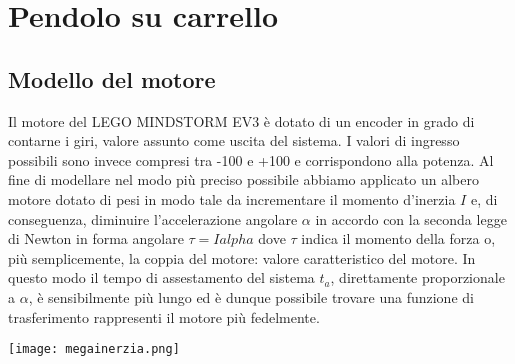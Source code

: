 
\chapter{Pendolo su carrello}
\section{Modello del motore}
Il motore del LEGO MINDSTORM EV3 è dotato di un encoder in grado di contarne i giri, valore assunto come uscita del sistema.
I valori di ingresso possibili sono invece compresi tra -100 e +100 e corrispondono alla potenza.
Al fine di modellare nel modo più preciso possibile abbiamo applicato un albero motore dotato di pesi in modo tale da incrementare il momento d'inerzia $I$ e, di conseguenza, diminuire l'accelerazione angolare $\alpha$ in accordo con la seconda legge di Newton in forma angolare $\tau = Ialpha$ dove $\tau$ indica il momento della forza o, più semplicemente, la coppia del motore: valore caratteristico del motore.
In questo modo il tempo di assestamento del sistema $t_a$, direttamente proporzionale a $\alpha$, è sensibilmente più lungo ed è dunque possibile trovare una funzione di trasferimento rappresenti il motore più fedelmente.
\begin{center}
	\texttt{[image: megainerzia.png]}
\end{center}